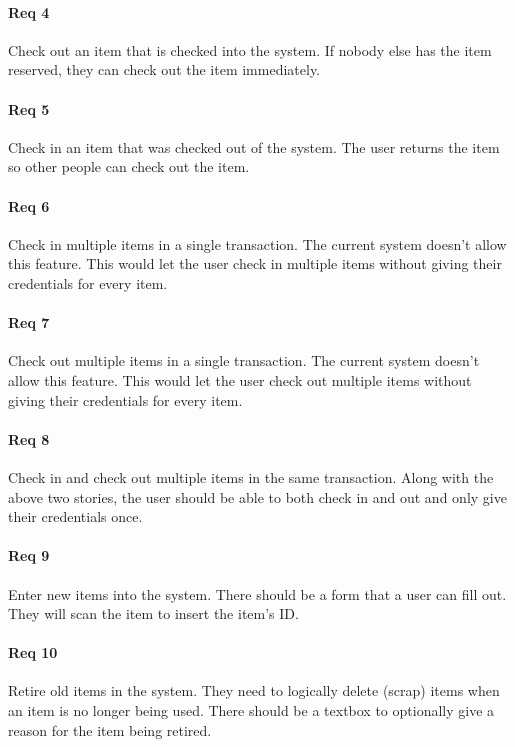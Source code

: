 \documentclass[10pt, onecolumn, twoside, peerreview]{IEEEtran}
\begin{document}
\paragraph*{Req 4} Check out an item that is checked into the system. If nobody else has the item reserved, they can check out the item
immediately.\\

\paragraph*{Req 5} Check in an item that was checked out of the system. The user returns the item so other people can check out the
item.\\

\paragraph*{Req 6} Check in multiple items in a single transaction. The current system doesn’t allow this feature. This would let the user
check in multiple items without giving their credentials for every item.\\

\paragraph*{Req 7} Check out multiple items in a single transaction. The current system doesn’t allow this feature. This would let the
user check out multiple items without giving their credentials for every item.\\

\paragraph*{Req 8} Check in and check out multiple items in the same transaction. Along with the above two stories, the user should be
able to both check in and out and only give their credentials once.\\

\paragraph*{Req 9} Enter new items into the system. There should be a form that a user can fill out. They will scan the item to insert the
item’s ID.\\

\paragraph*{Req 10} Retire old items in the system. They need to logically delete (scrap) items when an item is no longer being used. There
should be a textbox to optionally give a reason for the item being retired.\\
\end{document}
